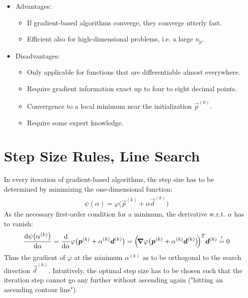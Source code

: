 			\begin{itemize}
				\item Advantages:
					\begin{itemize}
						\item If gradient-based algorithms converge, they converge utterly fast.
						\item Efficient also for high-dimensional problems, i.e. a large \( n_p \).
					\end{itemize}
				\item Disadvantages:
					\begin{itemize}
						\item Only applicable for functions that are differentiable almost everywhere.
						\item Require gradient information exact up to four to eight decimal points.
						\item Convergence to a local minimum near the initialization \( \vec{p}^{(0)} \).
						\item Require some expert knowledge.
					\end{itemize}
			\end{itemize}

	\section{Step Size Rules, Line Search}
		\label{sec:gradientUnconsStepSize}

		In every iteration of gradient-based algorithms, the step size has to be determined by minimizing the one-dimensional function:
		\begin{align*}
			\psi(\alpha) = \varphi\big(\vec{p}^{(k)} + \alpha \vec{d}^{(k)}\big)
		\end{align*}
		As the necessary first-order condition for a minimum, the derivative w.r.t. \(\alpha\) has to vanish:
		\begin{align*}
			\dv{\psi\big(\alpha^{(k)}\big)}{\alpha} = \dv{\alpha} \varphi\big(\bm{p}^{(k)} + \alpha^{(k)} \bm{d}^{(k)}\big) = \Big(\!\grad{\varphi}\big(\bm{p}^{(k)} + \alpha^{(k)} \bm{d}^{(k)}\big)\!\Big)^T \bm{d}^{(k)} \overset{!}{=} 0
		\end{align*}
		Thus the gradient of \(\varphi\) at the minimum \(\alpha^{(k)}\) as to be orthogonal to the search direction \(\vec{d}^{(k)}\). Intuitively, the optimal step size has to be chosen such that the iteration step cannot go any further without ascending again ("hitting an ascending contour line").

